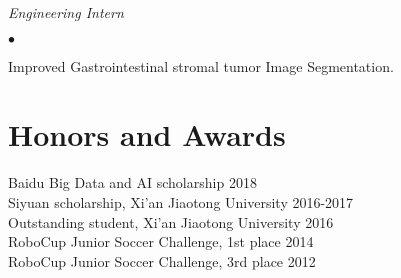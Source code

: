 \documentclass[margin,line]{res}
\newenvironment{list2}{
  \begin{list}{$\bullet$}{%
      \setlength{\itemsep}{0in}
      \setlength{\parsep}{0in} \setlength{\parskip}{0in}
      \setlength{\topsep}{0in} \setlength{\partopsep}{0in} 
      \setlength{\leftmargin}{0.2in}}}{\end{list}}
\begin{document}
\begin{resume}
\vspace{-.3in}
{\em Engineering Intern} %
\begin{list2}
\item Improved Gastrointestinal stromal tumor Image Segmentation.
\end{list2}



\section{\sc Honors and Awards} 
Baidu Big Data and AI scholarship \hfill 2018\\
Siyuan scholarship, Xi'an Jiaotong University \hfill 2016-2017\\
Outstanding student, Xi'an Jiaotong University \hfill 2016 \\
RoboCup Junior Soccer Challenge, 1st place \hfill 2014\\
RoboCup Junior Soccer Challenge, 3rd place \hfill 2012\\




\end{resume}
\end{document}
